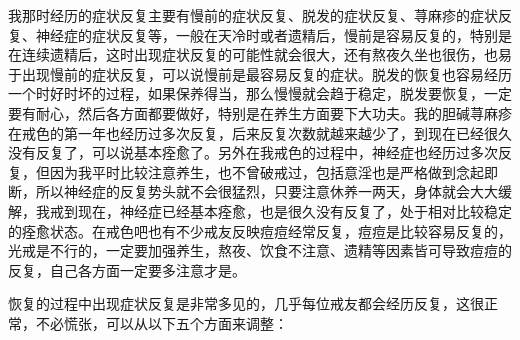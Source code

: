 \documentclass{ctexart}
\begin{document}
我那时经历的症状反复主要有慢前的症状反复、脱发的症状反复、荨麻疹的症状反复、神经症的症状反复等，一般在天冷时或者遗精后，慢前是容易反复的，特别是在连续遗精后，这时出现症状反复的可能性就会很大，还有熬夜久坐也很伤，也易于出现慢前的症状反复，可以说慢前是最容易反复的症状。脱发的恢复也容易经历一个时好时坏的过程，如果保养得当，那么慢慢就会趋于稳定，脱发要恢复，一定要有耐心，然后各方面都要做好，特别是在养生方面要下大功夫。我的胆碱荨麻疹在戒色的第一年也经历过多次反复，后来反复次数就越来越少了，到现在已经很久没有反复了，可以说基本痊愈了。另外在我戒色的过程中，神经症也经历过多次反复，但因为我平时比较注意养生，也不曾破戒过，包括意淫也是严格做到念起即断，所以神经症的反复势头就不会很猛烈，只要注意休养一两天，身体就会大大缓解，我戒到现在，神经症已经基本痊愈，也是很久没有反复了，处于相对比较稳定的痊愈状态。在戒色吧也有不少戒友反映痘痘经常反复，痘痘是比较容易反复的，光戒是不行的，一定要加强养生，熬夜、饮食不注意、遗精等因素皆可导致痘痘的反复，自己各方面一定要多注意才是。

恢复的过程中出现症状反复是非常多见的，几乎每位戒友都会经历反复，这很正常，不必慌张，可以从以下五个方面来调整：
\end{document}
